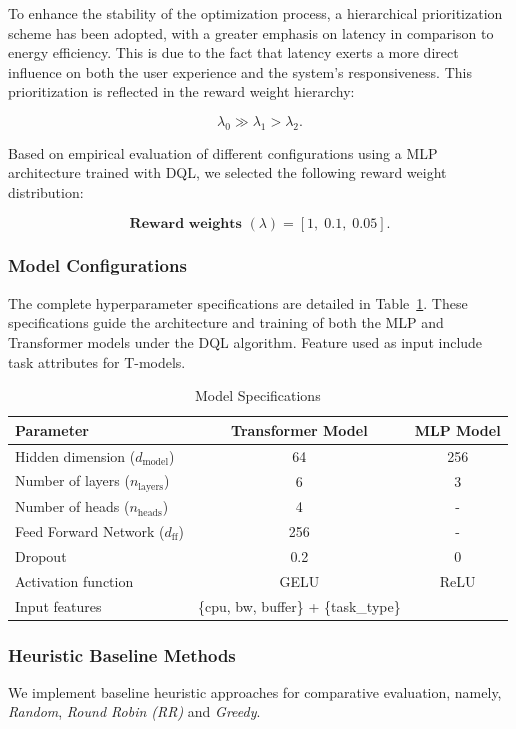 \documentclass{svproc}
\begin{document}
To enhance the stability of the optimization process, a hierarchical prioritization scheme has been adopted, with a greater emphasis on latency in comparison to energy efficiency. This is due to the fact that latency exerts a more direct influence on both the user experience and the system's responsiveness. This prioritization is reflected in the reward weight hierarchy:

\[
\lambda_0 \gg \lambda_1 > \lambda_2.
\]

Based on empirical evaluation of different configurations using a MLP architecture trained with DQL, we selected the following reward weight distribution:

\[
\textbf{Reward weights } (\lambda) = [1,\; 0.1,\; 0.05].
\]


\subsubsection{Model Configurations}

The complete hyperparameter specifications are detailed in Table~\ref{tab:model_specifications}. These specifications guide the architecture and training of both the MLP and Transformer models under the DQL algorithm. Feature used as input include task attributes for T-models.


\begin{table}[H]
\centering

\begin{tabular}{|l|c|c|}
\hline
\textbf{Parameter} & \textbf{Transformer Model} & \textbf{MLP Model} \\ \hline
Hidden dimension ($d_{\text{model}}$) & 64 & 256 \\ \hline
Number of layers ($n_{\text{layers}}$) & 6 & 3 \\ \hline
Number of heads ($n_{\text{heads}}$) & 4 & - \\ \hline
Feed Forward Network ($d_{\text{ff}}$) & 256 & - \\ \hline
Dropout & 0.2 & 0 \\ \hline
Activation function & GELU & ReLU \\ \hline
Input features & \{cpu, bw, buffer\} + \{task\_type\}  \\ \hline
\end{tabular}%
\caption{Model Specifications}\label{tab:model_specifications}
\end{table}

\subsubsection{Heuristic Baseline Methods}\label{subsubsec:heuristic_baselines}
We implement baseline heuristic approaches for comparative evaluation, namely, \emph{Random}, \emph{Round Robin (RR)} and \emph{Greedy}.
\end{document}
